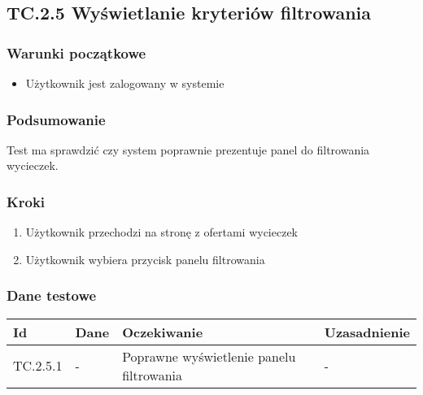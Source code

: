 \documentclass[a4paper,15pt]{article}
\begin{document}
\newpage
\begin{framed}
\subsection{TC.2.5 Wyświetlanie kryteriów filtrowania}


\vspace{0.5cm}

\subsubsection{Warunki początkowe}
\begin{itemize}
\item Użytkownik jest zalogowany w systemie
\end{itemize}

\subsubsection{Podsumowanie}
Test ma sprawdzić czy system poprawnie prezentuje panel do filtrowania wycieczek. 

\subsubsection{Kroki}
\begin{enumerate}
\item Użytkownik przechodzi na stronę z ofertami wycieczek
\item Użytkownik wybiera przycisk panelu filtrowania
\end{enumerate}

\subsubsection{Dane testowe}

\begin{center}
\begin{tabular}{ |C{1.5cm}|C{3cm}|C{4cm}|C{4cm}| } 
 \hline
 \textbf{Id} & \textbf{Dane} & \textbf{Oczekiwanie} & \textbf{Uzasadnienie} \\ \hline
 TC.2.5.1 & - & Poprawne wyświetlenie panelu filtrowania & - \\ \hline
\end{tabular}
\end{center}

\end{framed}
\end{document}
